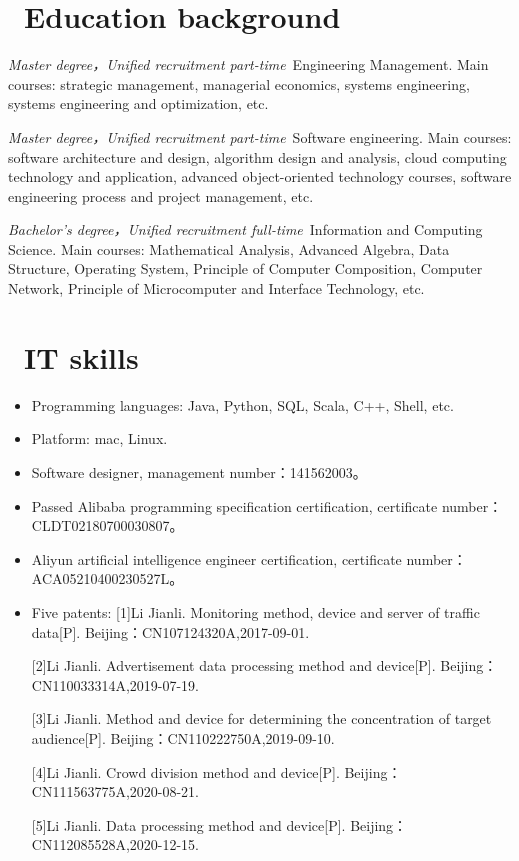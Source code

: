 \documentclass{resume}
\begin{document}
\section{\faGraduationCap\  Education background}
\textit{Master degree，Unified recruitment part-time}\ Engineering Management.
 Main courses: strategic management, managerial economics, systems engineering, systems engineering and optimization, etc.
 
\textit{Master degree，Unified recruitment part-time}\ Software engineering.
 Main courses: software architecture and design, algorithm design and analysis, cloud computing technology and application, advanced object-oriented technology courses, software engineering process and project management, etc.
 
\textit{Bachelor's degree，Unified recruitment full-time}\ Information and Computing Science.
 Main courses: Mathematical Analysis, Advanced Algebra, Data Structure, Operating System, Principle of Computer Composition, Computer Network, Principle of Microcomputer and Interface Technology, etc.


\section{\faCogs\ IT skills}
\begin{itemize}[parsep=0.5ex]
  \item Programming languages: Java, Python, SQL, Scala, C++, Shell, etc.
  \item Platform: mac, Linux.
  \item Software designer, management number：141562003。
  \item Passed Alibaba programming specification certification, certificate number：CLDT02180700030807。
 \item Aliyun artificial intelligence engineer certification, certificate number：ACA05210400230527L。
  \item Five patents:
[1]Li Jianli. Monitoring method, device and server of traffic data[P]. Beijing：CN107124320A,2017-09-01.

[2]Li Jianli. Advertisement data processing method and device[P]. Beijing：CN110033314A,2019-07-19.

[3]Li Jianli. Method and device for determining the concentration of target audience[P]. Beijing：CN110222750A,2019-09-10.

[4]Li Jianli. Crowd division method and device[P]. Beijing：CN111563775A,2020-08-21.

[5]Li Jianli. Data processing method and device[P]. Beijing：CN112085528A,2020-12-15.
\end{itemize}
\end{document}
